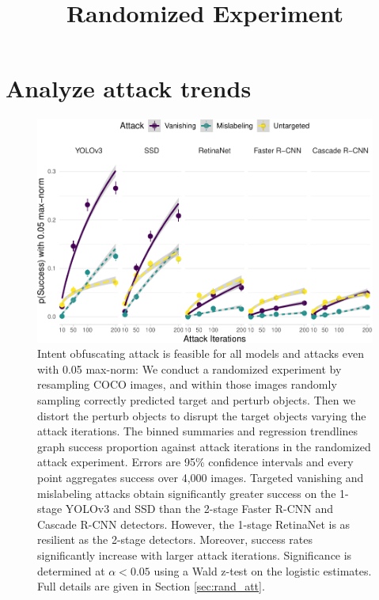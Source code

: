 \documentclass[
]{article}
\title{Randomized Experiment}
\author{}
\date{\vspace{-2.5em}}
\begin{document}
\maketitle

\section{Analyze attack trends}\label{analyze-attack-trends}

\begin{figure}[tb]

{\centering \includegraphics[width=1\linewidth]{imgs-normed/success_trend_graph-1} 

}

\caption{Intent obfuscating attack is feasible for all models and attacks even with 0.05 max-norm:  We conduct a randomized experiment by resampling COCO images, and within those images randomly sampling correctly predicted target and perturb objects. Then we distort the perturb objects to disrupt the target objects varying the attack iterations. The binned summaries and regression trendlines graph success proportion against attack iterations in the randomized attack experiment. Errors are 95\% confidence intervals and every point aggregates success over 4,000 images. Targeted vanishing and mislabeling attacks obtain significantly greater success on the 1-stage YOLOv3 and SSD than the 2-stage Faster R-CNN and Cascade R-CNN detectors. However, the 1-stage RetinaNet is as resilient as the 2-stage detectors. Moreover, success rates significantly increase with larger attack iterations. Significance is determined at $\alpha < 0.05$ using a Wald z-test on the logistic estimates. Full details are given in Section \ref{sec:rand_att}.}\label{fig:success_trend_graph}
\end{figure}
\end{document}

